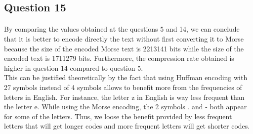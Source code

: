 \documentclass[a4paper, 11pt, oneside]{article}
\begin{document}

\subsection{Question 15}
\paragraph{}By comparing the values obtained at the questions 5 and 14, we can conclude that it is better to encode
directly the text without first converting it to Morse because the size of the encoded Morse text is 2213141 bits
while the size of the encoded text is 1711279 bits. Furthermore, the compression rate obtained is higher in question 14
compared to question 5.\\
This can be justified theoretically by the fact that using Huffman encoding with 27 symbols instead of 4 symbols allows to
benefit more from the frequencies of letters in English. For instance, the letter z in English is way less frequent
than the letter e. While using the Morse encoding, the 2 symbols . and - both appear for some of the letters. Thus, we
loose the benefit provided by less frequent letters that will get longer codes and more frequent letters will get shorter codes.

\end{document}

